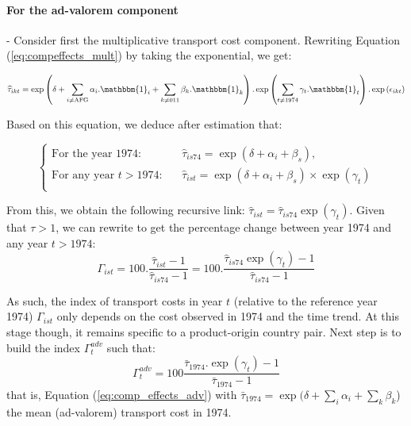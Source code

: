 \documentclass[a4paper,11pt]{article}
\begin{document}
\paragraph{For the ad-valorem component} - Consider first the multiplicative transport cost component.
Rewriting Equation (\ref{eq:compeffects_mult}) by taking the exponential, we get:

\begin{equation*}
\widehat{\tau}_{ikt}=\exp\left(\delta + \sum_{i \neq \text{AFG}}\alpha_i.\mathbbm{1}_i+\sum_{k\neq \text{011}}\beta_k.\mathbbm{1}_k\right).\exp\left(\sum_{t \neq 1974}\gamma_t.\mathbbm{1}_t\right) .\exp\left(\epsilon_{ikt}\right)
\end{equation*}

Based on this equation, we deduce after estimation that:

\[\left\{
  \begin{array}{lcl}
  \text{For the year 1974:} &&  \widehat{\tau}_{is74} = \exp(\delta +\alpha_i+\beta_s), \\
  \text{For any year }t> 1974:&& \widehat{\tau}_{ist} = \exp(\delta +\alpha_i+\beta_s)\times \exp(\gamma_t) \\
  \end{array}
\right.\]

From this, we obtain the following recursive link: $\widehat{\tau}_{ist} = \widehat{\tau}_{is74}\exp(\gamma_t)$.
Given that $\tau >1$, we can rewrite to get the percentage change between year 1974 and any year $t>1974$:
\begin{equation*}
\Gamma_{ist} = 100.\frac{\widehat{\tau}_{ist}-1}{\widehat{\tau}_{is74}-1} = 100.\frac{\widehat{\tau}_{is74}\exp(\gamma_t)-1}{\widehat{\tau}_{is74}-1}
\end{equation*}

As such, the index of transport costs in year $t$ (relative to the reference year 1974) $\Gamma_{ist} $  only depends on the cost observed in 1974 and the time trend.
At this stage though, it remains specific to a product-origin country pair.
Next step is to build the index $\Gamma^{adv}_t$ such that:
\begin{equation}
 \Gamma^{adv}_t= 100\frac {\bar{\tau}_{1974}.\exp(\gamma_t)-1} {\bar{\tau}_{1974}-1}  \label{eq:tcadv_compoeffect}
\end{equation}
\noindent that is, Equation (\ref{eq:comp_effects_adv}) with $\bar{\tau}_{1974} = \exp(\delta + \sum_i \alpha_i + \sum_k \beta_k$) the mean (ad-valorem) transport cost in 1974.
\end{document}
